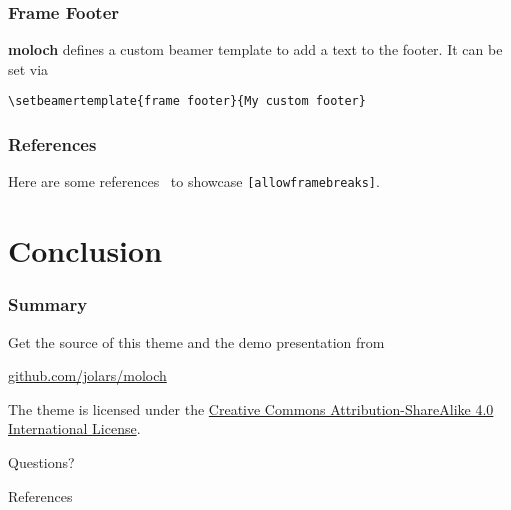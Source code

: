\documentclass[10pt]{beamer}
\newcommand{\themename}{\textbf{moloch}\xspace}
\begin{document}
{%
\begin{frame}[fragile]
  \frametitle{Frame Footer}
  \themename defines a custom beamer template to add a text to the footer. It can be set via
  \begin{verbatim}\setbeamertemplate{frame footer}{My custom footer}\end{verbatim}
\end{frame}
}

\begin{frame}[fragile]
  \frametitle{References}
  Here are some references~\cite{Knuth92,ConcreteMath,Simpson,Er01,greenwade93} to showcase \verb+[allowframebreaks]+.
\end{frame}

\section{Conclusion}

\begin{frame}
  \frametitle{Summary}

  Get the source of this theme and the demo presentation from
  \begin{center}
    \url{github.com/jolars/moloch}
  \end{center}

  The theme is licensed under the
  \href{http://creativecommons.org/licenses/by-sa/4.0/}{Creative Commons
    Attribution-ShareAlike 4.0 International License}.

  \begin{center}
    \ccbysa
  \end{center}

\end{frame}

\begin{frame}[standout]
  Questions?
\end{frame}

\appendix

\begin{frame}[allowframebreaks]{References}
  
  
\end{frame}
\end{document}
